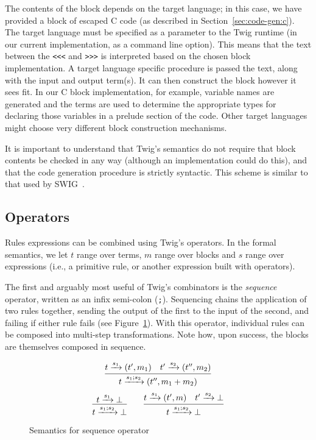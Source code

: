The contents of the block depends on the target language; in this case, we have provided a block of escaped C code (as described in Section~\ref{sec:code-gen:c}). The target language must be specified as a parameter to the Twig runtime (in our current implementation, as a command line option). This means that the text between the \verb|<<<| and \verb|>>>| is interpreted based on the chosen block implementation. A target language specific procedure is passed the text, along with the input and output term(s). It can then construct the block however it sees fit. In our C block implementation, for example, variable names are generated and the terms are used to determine the appropriate types for declaring those variables in a prelude section of the code. Other target languages might choose very different block construction mechanisms.

It is important to understand that Twig's semantics do not require that block contents be checked in any way (although an implementation could do this), and that the code generation procedure is strictly syntactic. This scheme is similar to that used by SWIG~\cite{swig}.

\subsection{Operators}
\label{sec:semantics:ops}

Rules expressions can be combined using Twig's operators. In the formal semantics, we let $t$ range over terms, $m$ range over blocks and $s$ range over expressions (i.e., a primitive rule, or another expression built with operators).

The first and arguably most useful of Twig's combinators is the \emph{sequence} operator, written as an infix semi-colon (\texttt{;}). Sequencing chains the application of two rules together, sending the output of the first to the input of the second, and failing if either rule fails (see Figure~\ref{fig:seq}). With this operator, individual rules can be composed into multi-step transformations. Note how, upon success, the blocks are themselves composed in sequence.

\begin{figure}[ht]
\[
\infer
  {t \arr{s_1;s_2} (t'',m_1+m_2)}
  {t \arr{s_1} (t',m_1) \quad t' \arr{s_2} (t'',m_2)}
\]
\[
\infer
  {t \arr{s_1;s_2} \bot}
  {t \arr{s_1} \bot}
\qquad
\infer
  {t \arr{s_1;s_2} \bot}
  {t \arr{s_1} (t',m) \quad t' \arr{s_2} \bot}
\]
\caption{Semantics for sequence operator}
\label{fig:seq}
\end{figure}

